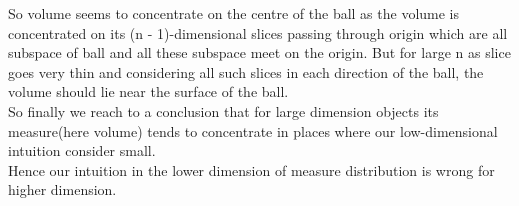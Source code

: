 \documentclass[oneside]{book}
\begin{document}
	
	
	
	
	So volume seems to concentrate on the centre of the ball as the volume is concentrated on its  (n - 1)-dimensional slices passing through origin which are all subspace of ball and all these subspace meet on the origin. But for large n as slice goes very thin and considering all such slices in each direction of the ball, the volume should lie near the surface of the ball.\\
	
	So finally we reach to a conclusion that for large dimension objects its measure(here volume) tends to concentrate in places where our low-dimensional intuition consider small.\\
	Hence our intuition in the lower dimension of measure distribution is wrong for higher dimension. 
	
	
	
	
	
	
	
	
	
	
	
\end{document}
